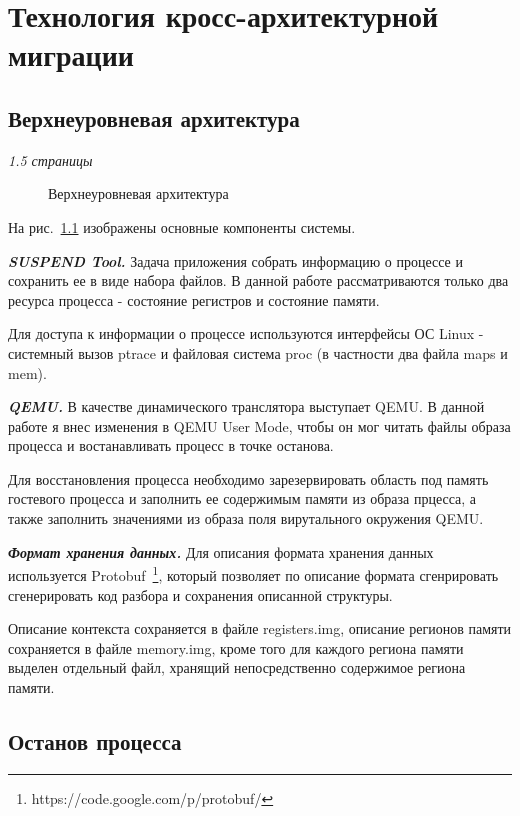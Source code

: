 \chapter{Технология кросс-архитектурной миграции}

\section{Верхнеуровневая архитектура}

\textit{1.5 страницы}

\begin{figure}[h]
\caption{Верхнеуровневая архитектура}
\label{pic:common_arch}
\end{figure}

На рис.~\ref{pic:common_arch} изображены основные компоненты системы.

\textbf{\textit{SUSPEND Tool.}} Задача приложения собрать информацию о процессе и сохранить ее в виде набора файлов. В данной работе рассматриваются только два ресурса процесса - состояние регистров и состояние памяти.

Для доступа к информации о процессе используются интерфейсы ОС Linux - системный вызов ptrace и файловая система proc (в частности два файла maps и mem).

\textbf{\textit{QEMU.}} В качестве динамического транслятора выступает QEMU. В данной работе я внес изменения в QEMU User Mode, чтобы он мог читать файлы образа процесса и востанавливать процесс в точке останова.

Для восстановления процесса необходимо зарезервировать область под память гостевого процесса и заполнить ее содержимым памяти из образа прцесса, а также заполнить значениями из образа поля вирутального окружения QEMU.

\textbf{\textit{Формат хранения данных.}} Для описания формата хранения данных используется Protobuf~\footnote{https://code.google.com/p/protobuf/}, который позволяет по описание формата сгенрировать сгенерировать код разбора и сохранения описанной структуры.

Описание контекста сохраняется в файле registers.img, описание регионов памяти сохраняется в файле memory.img, кроме того для каждого региона памяти выделен отдельный файл, хранящий непосредственно содержимое региона памяти.

\section{Останов процесса}

